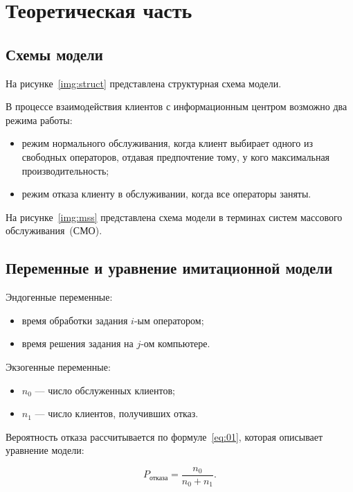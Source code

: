 \chapter{Теоретическая часть}

\section{Схемы модели}

На рисунке~\ref{img:struct} представлена структурная схема модели.


В процессе взаимодействия клиентов с информационным центром возможно два режима
работы:

\begin{itemize}
    \item режим нормального обслуживания, когда клиент выбирает одного из
        свободных операторов, отдавая предпочтение тому, у кого максимальная
        производительность;
    \item режим отказа клиенту в обслуживании, когда все операторы заняты.
\end{itemize}

На рисунке~\ref{img:mss} представлена схема модели в терминах систем массового
обслуживания~(СМО).

\vspace{0.5cm}

\section{Переменные и уравнение имитационной модели}

Эндогенные переменные:
\begin{itemize}
    \item время обработки задания $i$-ым оператором;
    \item время решения задания на $j$-ом компьютере.
\end{itemize}

Экзогенные переменные:
\begin{itemize}
    \item $n_0$ --- число обслуженных клиентов;
    \item $n_1$ --- число клиентов, получивших отказ.
\end{itemize}

Вероятность отказа рассчитывается по формуле~\ref{eq:01}, которая описывает
уравнение модели:

\begin{equation}\label{eq:01}
    P_{\text{отказа}} = \frac{n_0}{n_0 + n_1}.
\end{equation}
